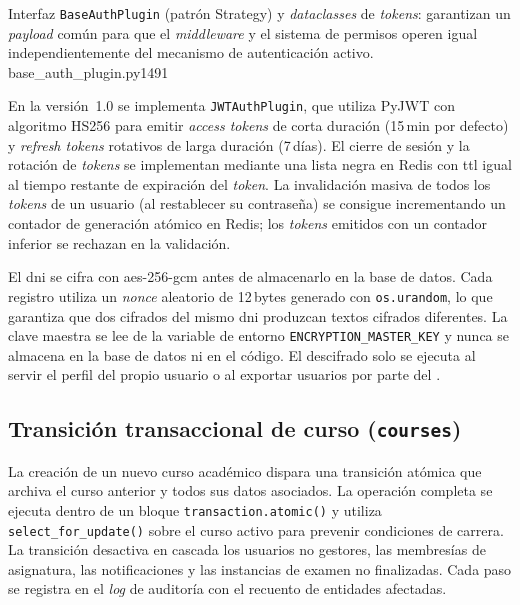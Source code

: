 %
           {Interfaz \texttt{BaseAuthPlugin} (patrón Strategy) y
            \textit{dataclasses} de \textit{tokens}: garantizan un
            \textit{payload} común para que el \textit{middleware} y
            el sistema de permisos operen igual independientemente del
            mecanismo de autenticación activo.}%
           {base_auth_plugin.py}{1}{49}{1}

En la versión~1.0 se implementa \texttt{JWTAuthPlugin}, que utiliza
PyJWT con algoritmo HS256 para emitir \textit{access tokens} de corta
duración (15\,min por defecto) y \textit{refresh tokens} rotativos de
larga duración (7\,días). El cierre de sesión y la rotación de
\textit{tokens} se implementan mediante una lista negra en Redis con
\acs{ttl} igual al tiempo restante de expiración del \textit{token}.
La invalidación masiva de todos los \textit{tokens} de un usuario
(al restablecer su contraseña) se consigue incrementando un contador
de generación atómico en Redis; los \textit{tokens} emitidos con un
contador inferior se rechazan en la validación.

El \acs{dni} se cifra con \acs{aes}-256-\acs{gcm} antes de almacenarlo
en la base de datos. Cada registro utiliza un \textit{nonce} aleatorio
de 12\,bytes generado con \texttt{os.urandom}, lo que garantiza que
dos cifrados del mismo \acs{dni} produzcan textos cifrados diferentes.
La clave maestra se lee de la variable de entorno
\texttt{ENCRYPTION\_MASTER\_KEY} y nunca se almacena en la base de
datos ni en el código. El descifrado solo se ejecuta al servir el
perfil del propio usuario o al exportar usuarios por parte del
.


\subsection{Transición transaccional de curso (\texttt{courses})}

La creación de un nuevo curso académico dispara una transición atómica
que archiva el curso anterior y todos sus datos asociados. La
operación completa se ejecuta dentro de un bloque
\texttt{transaction.atomic()} y utiliza \texttt{select\_for\_update()}
sobre el curso activo para prevenir condiciones de carrera. La
transición desactiva en cascada los usuarios no gestores, las
membresías de asignatura, las notificaciones y las instancias de
examen no finalizadas. Cada paso se registra en el \textit{log} de
auditoría con el recuento de entidades afectadas.


